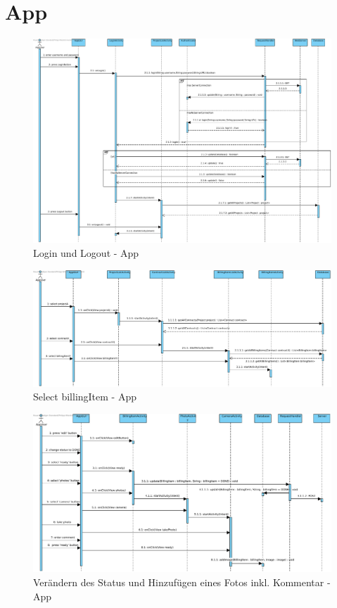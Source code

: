 \section{App}
\begin{figure}[H]
	\centering
	\includegraphics[width=\linewidth]{img/diagrams/App login, pull data, logout.pdf}		
	\caption{Login und Logout - App}
	\label{fig:sequenzdiagramm-app}
\end{figure}

\begin{figure}[H]
\centering
\includegraphics[width=\linewidth]{img/diagrams/Select BillingItem.pdf}		
\caption{Select billingItem - App}
\label{fig:sequenzdiagramm-app}
\end{figure}

\begin{figure}[H]
	\centering
	\includegraphics[width=\linewidth]{img/diagrams/change status, take photo.pdf}		
	\caption{Verändern des Status und Hinzufügen eines Fotos inkl. Kommentar - App}
	\label{fig:sequenzdiagramm-app}
\end{figure}
